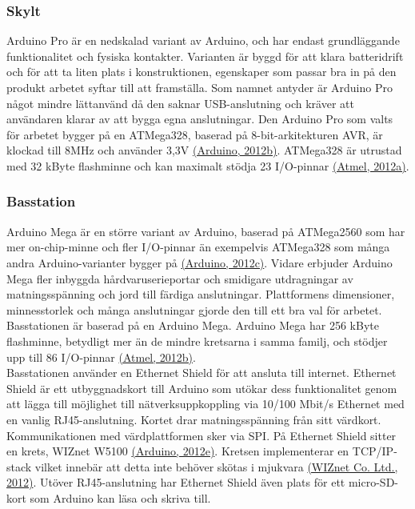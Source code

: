 \documentclass[a4paper,11pt]{article}
\begin{document}
\subsubsection{Skylt}
\label{skylt}
Arduino Pro är en nedskalad variant av Arduino, och har endast grundläggande funktionalitet och fysiska kontakter. Varianten är byggd för att klara batteridrift och för att ta liten plats i konstruktionen, egenskaper som passar bra in på den produkt arbetet syftar till att framställa. Som namnet antyder är Arduino Pro något mindre lättanvänd då den saknar USB-anslutning och kräver att användaren klarar av att bygga egna anslutningar. Den Arduino Pro som valts för arbetet bygger på en ATMega328, baserad på 8-bit-arkitekturen AVR, är klockad till 8MHz och använder 3,3V \hyperref[arduino]{(Arduino, 2012b)}. ATMega328 är utrustad med 32 kByte flashminne och kan maximalt stödja 23 I/O-pinnar \hyperref[atmel]{(Atmel, 2012a)}.

\subsubsection{Basstation}
Arduino Mega är en större variant av Arduino, baserad på ATMega2560 som har mer on-chip-minne och fler I/O-pinnar än exempelvis ATMega328 som många andra Arduino-varianter bygger på \hyperref[arduino]{(Arduino, 2012c)}. Vidare erbjuder Arduino Mega fler inbyggda hårdvaruserieportar och smidigare utdragningar av matningsspänning och jord till färdiga anslutningar. Plattformens dimensioner, minnesstorlek och många anslutningar gjorde den till ett bra val för arbetet. Basstationen är baserad på en Arduino Mega. Arduino Mega har 256 kByte flashminne, betydligt mer än de mindre kretsarna i samma familj, och stödjer upp till 86 I/O-pinnar \hyperref[atmel]{(Atmel, 2012b)}. \\

Basstationen använder en Ethernet Shield för att ansluta till internet. Ethernet Shield är ett utbyggnadskort till Arduino som utökar dess funktionalitet genom att lägga till möjlighet till nätverksuppkoppling via 10/100 Mbit/s Ethernet med en vanlig RJ45-anslutning. Kortet drar matningsspänning från sitt värdkort. Kommunikationen med värdplattformen sker via SPI. På Ethernet Shield sitter en krets, WIZnet W5100 \hyperref[arduino]{(Arduino, 2012e)}. Kretsen implementerar en TCP/IP-stack vilket innebär att detta inte behöver skötas i mjukvara \hyperref[wiznet]{(WIZnet Co. Ltd., 2012)}. Utöver RJ45-anslutning har Ethernet Shield även plats för ett micro-SD-kort som Arduino kan läsa och skriva till. \\
\end{document}
